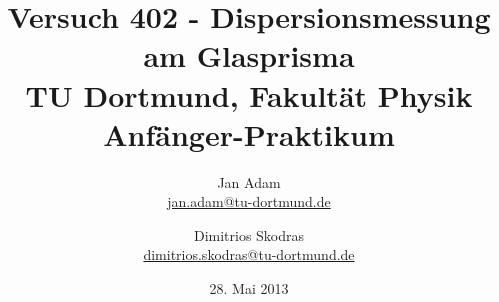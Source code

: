 



\title{Versuch 402 - Dispersionsmessung am Glasprisma\\				%
\large TU Dortmund, Fakultät Physik\\ 
\normalsize Anfänger-Praktikum}

\author{Jan Adam\\			%
{\small \href{jan.adam@tu-dortmund.de}{jan.adam@tu-dortmund.de}}	%
\and						%
Dimitrios Skodras\\					%
{\small \href{dimitrios.skodras@tu-dortmund.de}{dimitrios.skodras@tu-dortmund.de}}		%
}
\date{28. Mai 2013}				%





\maketitle					%
\thispagestyle{empty} 				%



\tableofcontents


\newpage					%


